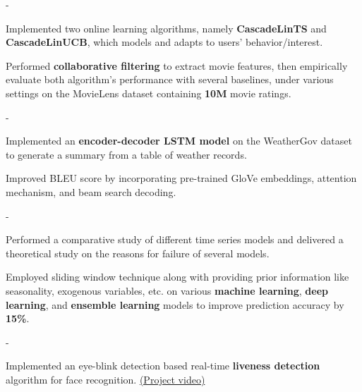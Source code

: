 \documentclass[11pt, a4paper]{awesome-cv}
\begin{document}

\begin{cventries}

		\cventry
	{ - }
	{}
	{}
{}
	{
		\begin{cvitems}
\item Implemented two online learning algorithms, namely \textbf{CascadeLinTS} and \textbf{CascadeLinUCB}, which models and adapts to users' behavior/interest.
\item Performed \textbf{collaborative filtering} to extract movie features, then empirically evaluate both algorithm's performance with several baselines, under various settings on the MovieLens dataset containing \textbf{10M} movie ratings. 
		\end{cvitems}	
	}

	\cventry
{ - }
{}
{}
{}
{
	\begin{cvitems}
		\item Implemented an \textbf{encoder-decoder LSTM model} on the WeatherGov dataset to generate a summary from a table of weather records.
		\item Improved BLEU score by incorporating pre-trained GloVe embeddings, attention mechanism, and beam search decoding.
	\end{cvitems}	
}



	\cventry
{ - }
{}
{}
{}
{
	\begin{cvitems}
		\item Performed a comparative study of different {time series models} and 
		delivered a theoretical study on the reasons for failure of several models.
		\item Employed sliding window technique along with providing prior information like seasonality, exogenous variables, etc. on various \textbf{machine learning}, \textbf{deep learning}, and \textbf{ensemble learning} models to improve prediction accuracy by \textbf{15\%}.
	\end{cvitems}	
}


\cventry
{ - }
{}
{}
{}
{
	\begin{cvitems}
		\item Implemented an eye-blink detection based real-time \textbf{liveness detection} algorithm for face recognition.
		\href{https://youtu.be/sNm2gxsGn-o}{{(Project video)}}
	\end{cvitems}	
}


\end{cventries}
\end{document}
